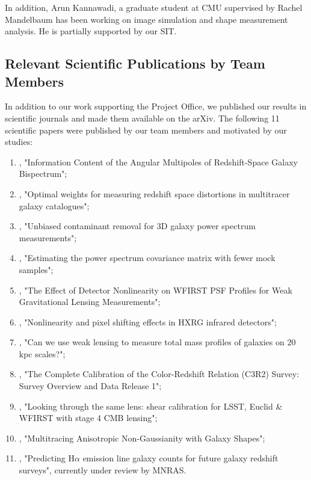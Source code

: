 In addition, Arun Kannawadi, a graduate student at CMU supervised by Rachel Mandelbaum has been working on image simulation and shape measurement analysis. He is partially supported by our SIT.

\subsection{Relevant Scientific Publications by Team Members}

In addition to our work supporting the Project Office, we published our results in scientific journals and made them available on the arXiv. The following 11 scientific papers were published by our team members and motivated by our studies:

\begin{enumerate}
\item \citet{2017MNRAS.467..928G}, "Information Content of the Angular Multipoles of Redshift-Space Galaxy Bispectrum";
\item \citet{2016MNRAS.463.2708P}, "Optimal weights for measuring redshift space distortions in multitracer galaxy catalogues";
\item \citet{2016MNRAS.463..467K}, "Unbiased contaminant removal for 3D galaxy power spectrum measurements";
\item \citet{2016MNRAS.457..993P}, "Estimating the power spectrum covariance matrix with fewer mock samples";
\item \citet{2016PASP..128j4001P}, "The Effect of Detector Nonlinearity on WFIRST PSF Profiles for Weak Gravitational Lensing Measurements";
\item \citet{2017JInst..12C4009P}, "Nonlinearity and pixel shifting effects in HXRG infrared detectors";
\item \citet{2015MNRAS.449.2128K}, "Can we use weak lensing to measure total mass profiles of galaxies on 20 kpc scales?";
\item \citet{Masters2017}, "The Complete Calibration of the Color-Redshift Relation (C3R2) Survey: Survey Overview and Data Release 1";
\item \citet{Schaan:2016ois}, "Looking through the same lens: shear calibration for LSST, Euclid \& WFIRST with stage 4 CMB lensing";
\item \citet{Chisari:2016xki}, "Multitracing Anisotropic Non-Gaussianity with Galaxy Shapes";
\item \citet{Merson2017}, "Predicting H$\alpha$ emission line galaxy counts for future galaxy redshift surveys", currently under review by MNRAS.
\end{enumerate}

